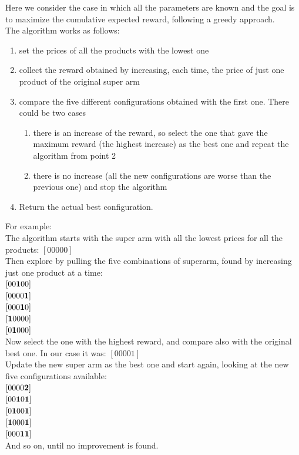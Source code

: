 Here we consider the case in which all the parameters are known and the goal is to maximize the cumulative expected reward, following a greedy approach.\\
The algorithm works as follows:
\begin{enumerate}
    \item set the prices of all the products with the lowest one
    \item collect the reward obtained by increasing, each time, the price of just one product of the original super arm
    \item compare the five different configurations obtained with the first one. There could be two cases\begin{enumerate}
        \item there is an increase of the reward, so select the one that gave the maximum reward (the highest increase) as the best one and repeat the algorithm from point 2
        \item there is no increase (all the new configurations are worse than the previous one) and stop the algorithm
    \end{enumerate}
    \item Return the actual best configuration.
\end{enumerate}
For example:\\
The algorithm starts with the super arm with all the lowest prices for all the products: $[0 0 0 0 0]$\\
Then explore by pulling the five combinations of superarm, found by increasing just one product at a time: \\
$[0 0 {\bf1} 0 0]$\\
$[0 0 0 0 {\bf1}]$\\
$[0 0 0 {\bf1} 0]$\\
$[{\bf1} 0 0 0 0]$\\
$[0 {\bf1} 0 0 0]$\\
Now select the one with the highest reward, and compare also with the original best one. In our case it was: $[0 0 0 0 1]$\\ Update the new super arm as the best one and start again, looking at the new five configurations available:\\
$[0 0 0 0 {\bf2}]$\\
$[0 0 {\bf1} 0 {\bf1}]$\\
$[0 {\bf1} 0 0 {\bf1}]$\\
$[{\bf1} 0 0 0 {\bf1}]$\\
$[0 0 0 {\bf1} {\bf1}]$\\
And so on, until no improvement is found.
